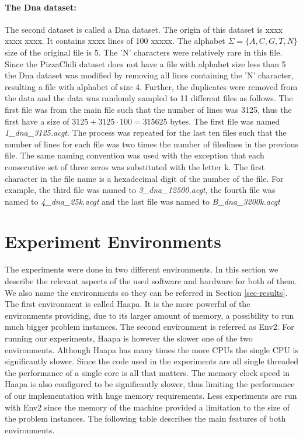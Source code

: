 \documentclass[english,twoside,censored,csm,algorithms-track-2020]{HYthesisML}
\theoremstyle{plain}
\theoremstyle{definition}
\begin{document}
\paragraph{The Dna dataset:}
The second dataset is called a Dna dataset. The origin of this dataset is xxxx xxxx xxxx.
It contains xxxx lines of 100 xxxxx. The alphabet $\Sigma=\{A,C,G,T,N\}$ size of the original file is 5.
The 'N' characters were relatively rare in this file. Since the PizzaChili dataset does not have a
file with alphabet size less than 5 the Dna dataset was modified by removing all lines containing
the 'N' character, resulting a file with alphabet of size 4.
Further, the duplicates were removed from the data and the data was randomly sampled to 11 different
files as follows. The first file was from the main file such that the number of lines was 3125, thus
the first have a size of $3125+3125\cdot 100 = 315625$ bytes. The first file was named
\textit{1\_dna\_3125.acgt}. The process was repeated for the last ten files such that the number
of lines for each file was two times the number of fileslines in the previous file.
The same naming convention
was used with the exception that each consecutive set of three zeros was substituted with the letter k.
The first character in the file name is a hexadecimal digit of the number of the file.
For example, the third file was named to \textit{3\_dna\_12500.acgt}, the fourth file was named
to \textit{4\_dna\_25k.acgt} and the last file was named to \textit{B\_dna\_3200k.acgt}

\section{Experiment Environments}

The experiments were done in two different environments. In this section we describe the relevant
aspects of the used software and hardware for both of them. We also name the environments so they
can be referred in Section \ref{sec-results}. The first environment is called Haapa. It is the more
powerful of the environments providing, due to its larger amount of memory, a possibility to run
much bigger problem instances. The second
environment is referred as Env2. For running
our experiments, Haapa is however the slower one of the two environments. Although Haapa has many times
the more CPUs the single CPU is significantly slower. Since the code used in the experiments
are all single threaded the performance of a single core is all that matters. The memory
clock speed in Haapa is also configured to be significantly slower, thus limiting the performance
of our implementation with huge memory requirements. Less experiments are run with Env2 since the
memory of the machine provided a limitation to the size of the problem instances.
The following table describes the main features of both environments.
\end{document}
